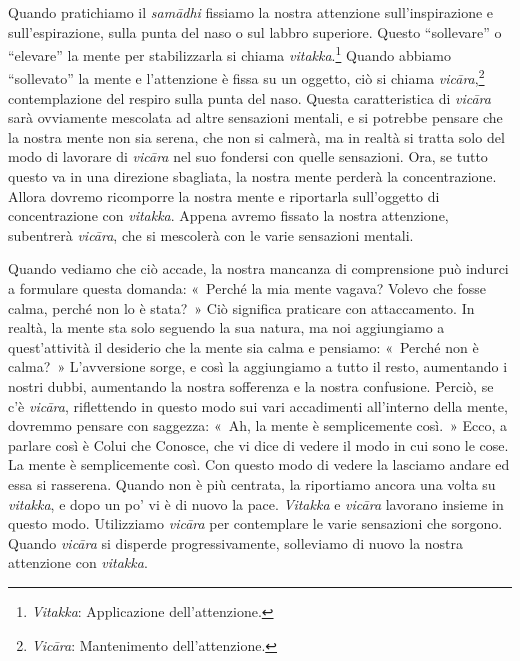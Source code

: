Quando pratichiamo il \emph{samādhi} fissiamo la nostra attenzione
sull'inspirazione e sull'espirazione, sulla punta del naso o sul labbro
superiore. Questo ``sollevare'' o ``elevare'' la mente per stabilizzarla
si chiama \emph{vitakka}.\footnote{\emph{Vitakka}: Applicazione
  dell'attenzione.} Quando abbiamo ``sollevato'' la mente e l'attenzione
è fissa su un oggetto, ciò si chiama \emph{vicāra},\footnote{\emph{Vicāra}:
  Mantenimento dell'attenzione.} contemplazione del respiro sulla punta
del naso. Questa caratteristica di \emph{vicāra} sarà ovviamente
mescolata ad altre sensazioni mentali, e si potrebbe pensare che la
nostra mente non sia serena, che non si calmerà, ma in realtà si tratta
solo del modo di lavorare di \emph{vicāra} nel suo fondersi con quelle
sensazioni. Ora, se tutto questo va in una direzione sbagliata, la
nostra mente perderà la concentrazione. Allora dovremo ricomporre la
nostra mente e riportarla sull'oggetto di concentrazione con
\emph{vitakka}. Appena avremo fissato la nostra attenzione, subentrerà
\emph{vicāra}, che si mescolerà con le varie sensazioni mentali.

Quando vediamo che ciò accade, la nostra mancanza di comprensione può
indurci a formulare questa domanda: «~Perché la mia mente vagava? Volevo
che fosse calma, perché non lo è stata?~» Ciò significa praticare con
attaccamento. In realtà, la mente sta solo seguendo la sua natura, ma
noi aggiungiamo a quest'attività il desiderio che la mente sia calma e
pensiamo: «~Perché non è calma?~» L'avversione sorge, e così la
aggiungiamo a tutto il resto, aumentando i nostri dubbi, aumentando la
nostra sofferenza e la nostra confusione. Perciò, se c'è \emph{vicāra},
riflettendo in questo modo sui vari accadimenti all'interno della mente,
dovremmo pensare con saggezza: «~Ah, la mente è semplicemente così.~»
Ecco, a parlare così è Colui che Conosce, che vi dice di vedere il modo
in cui sono le cose. La mente è semplicemente così. Con questo modo di
vedere la lasciamo andare ed essa si rasserena. Quando non è più
centrata, la riportiamo ancora una volta su \emph{vitakka}, e dopo un
po' vi è di nuovo la pace. \emph{Vitakka} e \emph{vicāra} lavorano
insieme in questo modo. Utilizziamo \emph{vicāra} per contemplare le
varie sensazioni che sorgono. Quando \emph{vicāra} si disperde
progressivamente, solleviamo di nuovo la nostra attenzione con
\emph{vitakka}.

